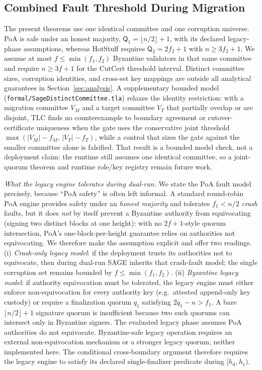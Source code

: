 \documentclass[journal]{IEEEtran}
\theoremstyle{definition}
\theoremstyle{remark}
\begin{document}
\subsection{Combined Fault Threshold During Migration}
The present theorems use one identical committee and one corruption universe. PoA is safe under an
honest majority, $\mathsf{Q}_1=\lfloor n/2\rfloor+1$, with its declared legacy-phase assumptions,
whereas HotStuff requires $\mathsf{Q}_2=2f_2+1$ with $n\ge 3f_2+1$. We assume at most
$f\le\min(f_1,f_2)$ Byzantine validators in that same committee and require $n\ge3f+1$ for the
CutCert threshold interval. Distinct committee sizes, corruption identities, and cross-set key
mappings are outside all analytical guarantees in Section~\ref{sec:analysis}. A supplementary
bounded model (\texttt{formal/SageDistinctCommittee.tla}) relaxes the identity restriction: with a
migration committee $V_M$ and a target committee $V_T$ that partially overlap or are disjoint, TLC
finds no counterexample to boundary agreement or cutover-certificate uniqueness when the gate uses
the conservative joint threshold $\max(|V_M|-f_M,\,|V_T|-f_T)$, while a control that sizes the gate
against the smaller committee alone is falsified. That result is a bounded model check, not a
deployment claim: the runtime still assumes one identical committee, so a joint-quorum theorem and
runtime role/key registry remain future work.

\emph{What the legacy engine tolerates during dual-run.} We state the PoA fault model
precisely, because ``PoA safety'' is often left informal. A standard round-robin PoA engine
provides safety under an \emph{honest majority} and tolerates $f_1<n/2$ \emph{crash} faults,
but it does \emph{not} by itself prevent a Byzantine authority from equivocating (signing two
distinct blocks at one height): with no $2f{+}1$-style quorum intersection, PoA's one-block-per-height
guarantee relies on authorities not equivocating. We therefore make the assumption explicit and
offer two readings. (i) \emph{Crash-only legacy model}: if the deployment trusts its authorities
not to equivocate, then during dual-run SAGE inherits that crash-fault model; the single corruption
set remains bounded by $f\le\min(f_1,f_2)$. (ii) \emph{Byzantine legacy model}: if authority equivocation
must be tolerated, the legacy engine must either enforce non-equivocation for every authority key
(e.g.\ attested append-only key custody) or require a finalization quorum $q_1$ satisfying
$2q_1-n>f_1$. A bare $\lfloor n/2\rfloor+1$ signature quorum is insufficient because two such
quorums can intersect only in Byzantine signers. The evaluated legacy phase assumes PoA authorities do not equivocate. Byzantine-safe legacy
operation requires an external non-equivocation mechanism or a stronger legacy quorum, neither
implemented here. The conditional cross-boundary argument therefore requires the legacy engine to
satisfy its declared single-finalizer predicate during $[h_{\mathrm d},h_{\mathrm c})$.
\end{document}
